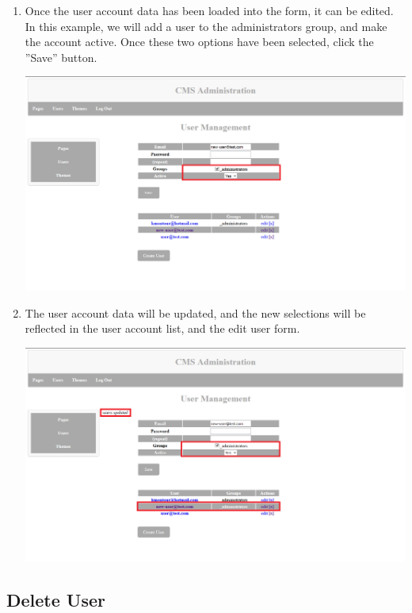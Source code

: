 \documentclass[12pt]{article}
\begin{document}
\begin{enumerate}
  \item Once the user account data has been loaded into the form, it can be edited. In this example, we will add a user to the administrators group, and make the account active. Once these two options have been selected, click the ''Save'' button.  
  
  \includegraphics[width=\textwidth,height=\textheight,keepaspectratio]{pics/editUser_4.png}
  
  \item The user account data will be updated, and the new selections will be reflected in the user account list, and the edit user form.
  
  \includegraphics[width=\textwidth,height=\textheight,keepaspectratio]{pics/editUser_5.png}

\end{enumerate}

\subsection{Delete User}
\end{document}
